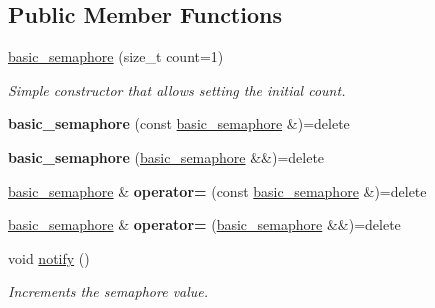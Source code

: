 \subsection*{Public Member Functions}
\begin{DoxyCompactItemize}
\item 
\hyperlink{classcpen333_1_1thread_1_1basic__semaphore_adfcd90a6776f9bdbb580bff6d9fa2a3e}{basic\+\_\+semaphore} (size\+\_\+t count=1)
\begin{DoxyCompactList}\small\item\em Simple constructor that allows setting the initial count. \end{DoxyCompactList}\item 
\mbox{\label{classcpen333_1_1thread_1_1basic__semaphore_aa09fc45f7f9689046175fbdd3ee0a19d}} 
{\bfseries basic\+\_\+semaphore} (const \hyperlink{classcpen333_1_1thread_1_1basic__semaphore}{basic\+\_\+semaphore} \&)=delete
\item 
\mbox{\label{classcpen333_1_1thread_1_1basic__semaphore_adb6c92c4f7ba870dc20b96e4fd655ee7}} 
{\bfseries basic\+\_\+semaphore} (\hyperlink{classcpen333_1_1thread_1_1basic__semaphore}{basic\+\_\+semaphore} \&\&)=delete
\item 
\mbox{\label{classcpen333_1_1thread_1_1basic__semaphore_aaefa267aafa84e5baf759c38769d50d1}} 
\hyperlink{classcpen333_1_1thread_1_1basic__semaphore}{basic\+\_\+semaphore} \& {\bfseries operator=} (const \hyperlink{classcpen333_1_1thread_1_1basic__semaphore}{basic\+\_\+semaphore} \&)=delete
\item 
\mbox{\label{classcpen333_1_1thread_1_1basic__semaphore_aa1e893a6e7c37d4d3d48086bbac79235}} 
\hyperlink{classcpen333_1_1thread_1_1basic__semaphore}{basic\+\_\+semaphore} \& {\bfseries operator=} (\hyperlink{classcpen333_1_1thread_1_1basic__semaphore}{basic\+\_\+semaphore} \&\&)=delete
\item 
void \hyperlink{classcpen333_1_1thread_1_1basic__semaphore_a0b5032fc8df915cb51276411b1153b84}{notify} ()
\begin{DoxyCompactList}\small\item\em Increments the semaphore value. \end{DoxyCompactList}\item 

\end{DoxyCompactItemize}

